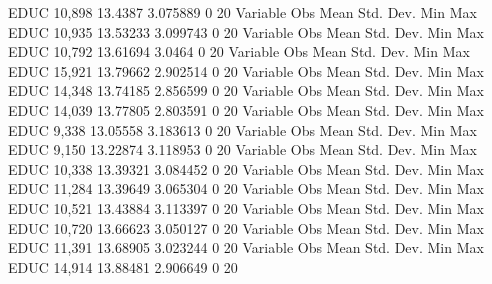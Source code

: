         EDUC {\VBAR}     10,898     13.4387    3.075889          0         20
{\smallskip}
    Variable {\VBAR}        Obs        Mean    Std. Dev.       Min        Max
        EDUC {\VBAR}     10,935    13.53233    3.099743          0         20
{\smallskip}
    Variable {\VBAR}        Obs        Mean    Std. Dev.       Min        Max
        EDUC {\VBAR}     10,792    13.61694      3.0464          0         20
{\smallskip}
    Variable {\VBAR}        Obs        Mean    Std. Dev.       Min        Max
        EDUC {\VBAR}     15,921    13.79662    2.902514          0         20
{\smallskip}
    Variable {\VBAR}        Obs        Mean    Std. Dev.       Min        Max
        EDUC {\VBAR}     14,348    13.74185    2.856599          0         20
{\smallskip}
    Variable {\VBAR}        Obs        Mean    Std. Dev.       Min        Max
        EDUC {\VBAR}     14,039    13.77805    2.803591          0         20
{\smallskip}
    Variable {\VBAR}        Obs        Mean    Std. Dev.       Min        Max
        EDUC {\VBAR}      9,338    13.05558    3.183613          0         20
{\smallskip}
    Variable {\VBAR}        Obs        Mean    Std. Dev.       Min        Max
        EDUC {\VBAR}      9,150    13.22874    3.118953          0         20
{\smallskip}
    Variable {\VBAR}        Obs        Mean    Std. Dev.       Min        Max
        EDUC {\VBAR}     10,338    13.39321    3.084452          0         20
{\smallskip}
    Variable {\VBAR}        Obs        Mean    Std. Dev.       Min        Max
        EDUC {\VBAR}     11,284    13.39649    3.065304          0         20
{\smallskip}
    Variable {\VBAR}        Obs        Mean    Std. Dev.       Min        Max
        EDUC {\VBAR}     10,521    13.43884    3.113397          0         20
{\smallskip}
    Variable {\VBAR}        Obs        Mean    Std. Dev.       Min        Max
        EDUC {\VBAR}     10,720    13.66623    3.050127          0         20
{\smallskip}
    Variable {\VBAR}        Obs        Mean    Std. Dev.       Min        Max
        EDUC {\VBAR}     11,391    13.68905    3.023244          0         20
{\smallskip}
    Variable {\VBAR}        Obs        Mean    Std. Dev.       Min        Max
        EDUC {\VBAR}     14,914    13.88481    2.906649          0         20
